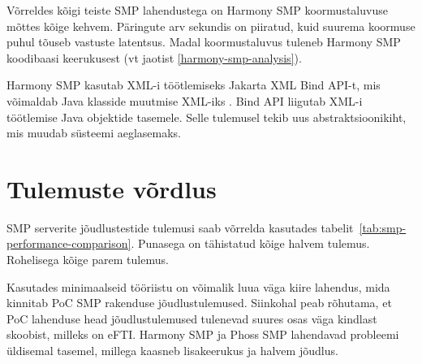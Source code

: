 Võrreldes kõigi teiste SMP lahendustega on Harmony SMP koormustaluvuse mõttes kõige kehvem.
Päringute arv sekundis on piiratud, kuid suurema koormuse puhul tõuseb vastuste latentsus.
Madal koormustaluvus tuleneb Harmony SMP koodibaasi keerukusest
(vt jaotist \ref{harmony-smp-analysis}). 

Harmony SMP kasutab XML-i töötlemiseks Jakarta XML Bind API-t, mis võimaldab Java 
klasside muutmise XML-iks \cite{jakarta_xml_bind_api} \cite{niis_harmony_smp_repo}.
Bind API liigutab XML-i töötlemise Java objektide tasemele. 
Selle tulemusel tekib uus abstraktsioonikiht, mis muudab süsteemi aeglasemaks.


\section{Tulemuste võrdlus}

SMP serverite jõudlustestide tulemusi saab võrrelda kasutades tabelit~\ref{tab:smp-performance-comparison}.
Punasega on tähistatud kõige halvem tulemus. Rohelisega kõige parem tulemus.

Kasutades minimaalseid tööriistu on võimalik luua väga kiire lahendus, 
mida kinnitab PoC SMP rakenduse jõudlustulemused.
Siinkohal peab rõhutama, et PoC lahenduse head jõudlustulemused tulenevad suures osas
väga kindlast skoobist, milleks on eFTI. Harmony SMP ja Phoss SMP lahendavad 
probleemi üldisemal tasemel, millega kaasneb lisakeerukus ja halvem jõudlus.


